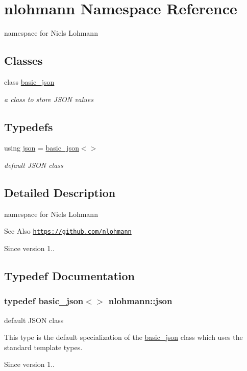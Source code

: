 \hypertarget{namespacenlohmann}{\section{nlohmann Namespace Reference}
\label{namespacenlohmann}
}


namespace for Niels Lohmann  


\subsection*{Classes}
\begin{DoxyCompactItemize}
\item 
class \hyperlink{classnlohmann_1_1basic__json}{basic\-\_\-json}
\begin{DoxyCompactList}\small\item\em a class to store J\-S\-O\-N values \end{DoxyCompactList}\end{DoxyCompactItemize}
\subsection*{Typedefs}
\begin{DoxyCompactItemize}
\item 
using \hyperlink{namespacenlohmann_a9cc9a3033850a092f791d86854d117fc}{json} = \hyperlink{classnlohmann_1_1basic__json}{basic\-\_\-json}$<$$>$
\begin{DoxyCompactList}\small\item\em default J\-S\-O\-N class \end{DoxyCompactList}\end{DoxyCompactItemize}


\subsection{Detailed Description}
namespace for Niels Lohmann \begin{DoxySeeAlso}{See Also}
\href{https://github.com/nlohmann}{\tt https\-://github.\-com/nlohmann} 
\end{DoxySeeAlso}
\begin{DoxySince}{Since}
version 1.. 
\end{DoxySince}


\subsection{Typedef Documentation}
\hypertarget{namespacenlohmann_a9cc9a3033850a092f791d86854d117fc}{
\subsubsection[{json}]{\setlength{\rightskip}{0pt plus 5cm}typedef {\bf basic\-\_\-json}$<$$>$ {\bf nlohmann\-::json}}}\label{namespacenlohmann_a9cc9a3033850a092f791d86854d117fc}


default J\-S\-O\-N class 

This type is the default specialization of the \hyperlink{classnlohmann_1_1basic__json}{basic\-\_\-json} class which uses the standard template types.

\begin{DoxySince}{Since}
version 1.. 
\end{DoxySince}
